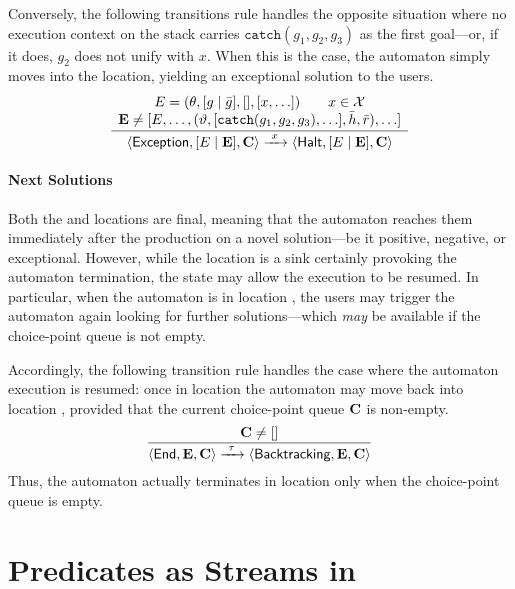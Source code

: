 \documentclass[12pt,a4paper,openright,twoside]{book}
\begin{document}
Conversely, the following transitions rule handles the opposite situation where no execution context on the stack carries $\mathtt{catch}(g_1, g_2, g_3)$ as the first goal---or, if it does, $g_2$ does not unify with $x$.
%
When this is the case, the automaton simply moves into the  location, yielding an exceptional solution to the users.
%
\[
\frac{
    \begin{array}{c}
        E = (\theta, [g \mid \bar{g}], [], [x, \ldots])
        \qquad
        x \in \mathcal{X}
        \\
        \mathbf{E} \neq [E, \ldots, (\vartheta, [\mathtt{catch}(g_1, g_2, g_3), \ldots], \bar{h}, \bar{r}), \ldots]
    \end{array}
}{
    \langle \textsf{Exception}, [E \mid \mathbf{E}], \mathbf{C} \rangle
    \xrightarrow{\ x\ }
    \langle \textsf{Halt}, [E \mid \mathbf{E}], \mathbf{C} \rangle
}
\]

\paragraph{Next Solutions}

Both the  and  locations are final, meaning that the automaton reaches them immediately after the production on a novel solution---be it positive, negative, or exceptional.
%
However, while the  location is a sink certainly provoking the automaton termination, the  state may allow the execution to be resumed.
%
In particular, when the automaton is in location , the users may trigger the automaton again looking for further solutions---which \emph{may} be available if the choice-point queue is not empty.

Accordingly, the following transition rule handles the case where the automaton execution is resumed: once in location  the automaton may move back into location , provided that the current choice-point queue $\mathbf{C}$ is non-empty.
%
\[
\frac{
    \mathbf{C} \neq []
}{
    \langle \textsf{End}, \mathbf{E}, \mathbf{C} \rangle
    \xrightarrow{\ \tau\ }
    \langle \textsf{Backtracking}, \mathbf{E}, \mathbf{C} \rangle
}
\]
%
Thus, the automaton actually terminates in location  only when the choice-point queue is empty.

\section{Predicates as Streams in \twopkt{}}
\end{document}
